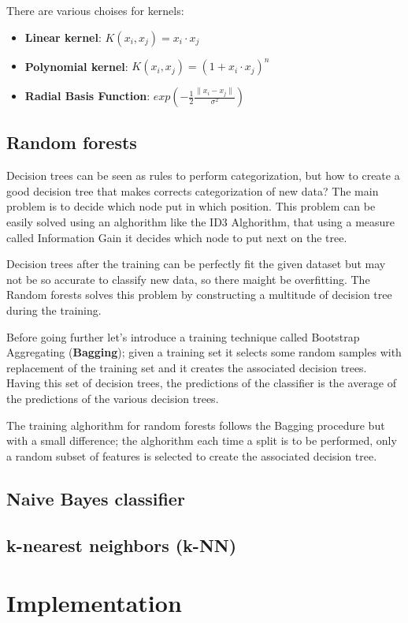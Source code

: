 \documentclass[12pt]{article}
\begin{document}
There are various choises for kernels:
\begin{itemize}
    \item \textbf{Linear kernel}: $K(x_i, x_j) = x_i \cdot x_j$
    \item \textbf{Polynomial kernel}: $K(x_i, x_j) = (1 + x_i \cdot x_j)^n$
    \item \textbf{Radial Basis Function}: $exp(- \frac{1}{2} \frac{\|x_i-x_j\|}{\sigma^2})$
\end{itemize}

\subsection{Random forests}

Decision trees can be seen as rules to perform categorization, but how to create a
good decision tree that makes corrects categorization of new data? The main
problem is to decide which node put in which position. This problem can be easily
solved using an alghorithm like the ID3 Alghorithm, that using a measure 
called Information Gain it decides which node to put next on the tree.

Decision trees after the training can be perfectly fit the given dataset but may
not be so accurate to classify new data, so there maight be overfitting.
The Random forests solves this problem by constructing a multitude of 
decision tree during the training.

Before going further let's introduce a training technique called 
Bootstrap Aggregating (\textbf{Bagging}); given a training set it 
selects some random samples with replacement of the training set and it creates the 
associated decision trees. Having this set of decision trees, the predictions of the 
classifier is the average of the predictions of the various decision trees.

The training alghorithm for random forests follows the 
Bagging procedure but with a small difference; the 
alghorithm each time a split is to be performed, only a random subset of features is
selected to create the associated decision tree. 

\subsection{Naive Bayes classifier}

\subsection{k-nearest neighbors (k-NN)}

\section{Implementation}
\end{document}
